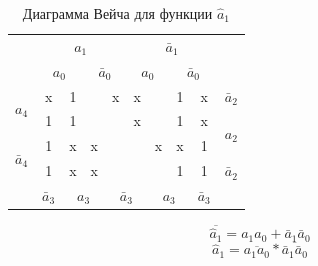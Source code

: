 \documentclass[a4paper,14pt]{article}
\begin{document}
\begin{table}[H]
				\begin{center}
		\caption{\label{tab:a1_preobr} Диаграмма Вейча для функции $\hat{a}_1$}

		\begin{tabular}{cccccccccc}
			& \multicolumn{4}{c}{$a_1$} & \multicolumn{4}{c}{$\bar{a}_1$} &  \\
			& \multicolumn{2}{c}{$a_0$} & \multicolumn{2}{c}{$\bar{a}_0$} & \multicolumn{2}{c}{$a_0$} & \multicolumn{2}{c}{$\bar{a}_0$} &  \\ \cline{2-9}
			\multicolumn{1}{c|}{\multirow{2}{*}{$a_4$}} & \multicolumn{1}{c|}{x} & \multicolumn{1}{c|}{1} & \multicolumn{1}{c|}{} & \multicolumn{1}{c|}{x} & \multicolumn{1}{c|}{x} & \multicolumn{1}{c|}{} & \multicolumn{1}{c|}{1} & \multicolumn{1}{c|}{x} & $\bar{a}_2$ \\ \cline{2-9}
			\multicolumn{1}{c|}{} & \multicolumn{1}{c|}{1} & \multicolumn{1}{c|}{1} & \multicolumn{1}{c|}{} & \multicolumn{1}{c|}{} & \multicolumn{1}{c|}{x} & \multicolumn{1}{c|}{} & \multicolumn{1}{c|}{1} & \multicolumn{1}{c|}{x} & \multirow{2}{*}{$a_2$} \\ \cline{2-9}
			\multicolumn{1}{c|}{\multirow{2}{*}{$\bar{a}_4$}} & \multicolumn{1}{c|}{1} & \multicolumn{1}{c|}{x} & \multicolumn{1}{c|}{x} & \multicolumn{1}{c|}{} & \multicolumn{1}{c|}{} & \multicolumn{1}{c|}{x} & \multicolumn{1}{c|}{x} & \multicolumn{1}{c|}{1} &  \\ \cline{2-9}
			\multicolumn{1}{c|}{} & \multicolumn{1}{c|}{1} & \multicolumn{1}{c|}{x} & \multicolumn{1}{c|}{x} & \multicolumn{1}{c|}{} & \multicolumn{1}{c|}{} & \multicolumn{1}{c|}{} & \multicolumn{1}{c|}{1} & \multicolumn{1}{c|}{1} & $\bar{a}_2$ \\ \cline{2-9}
			& $\bar{a}_3$ & \multicolumn{2}{c}{$a_3$} & \multicolumn{2}{c}{$\bar{a}_3$} & \multicolumn{2}{c}{$a_3$} & $\bar{a}_3$ & 
		\end{tabular}

\end{center}
\end{table}


$$\overline{\hat{a}_1} = a_1 a_0 + \bar{a}_1\bar{a}_0$$
$$\hat{a}_1 = \overline{a_1 a_0} * \overline{\bar{a}_1\bar{a}_0}$$
\end{document}

